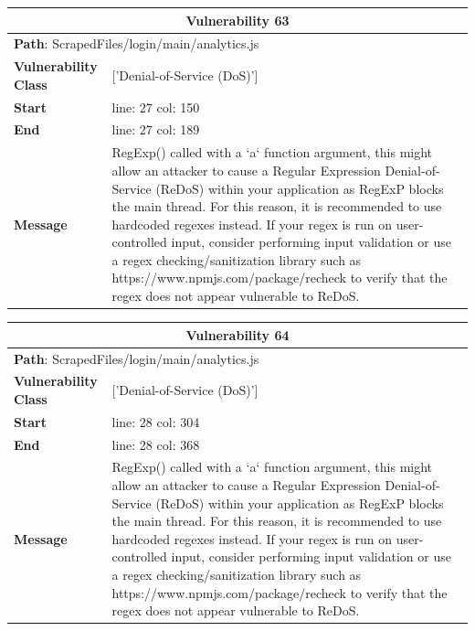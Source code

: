 \documentclass[12pt]{article}
\begin{document}
\FloatBarrier
\begin{table}[!h]
\centering
\renewcommand{\arraystretch}{1.3}
\begin{tabular}{|l|p{10cm}|}
\hline
\multicolumn{2}{|c|}{\textbf{Vulnerability 63}} \\
\hline
\multicolumn{2}{|l|}{\textbf{Path}: ScrapedFiles/login/main/analytics.js} \\
\hline
\textbf{Vulnerability Class} & ['Denial-of-Service (DoS)'] \\
\hline
\textbf{Start} & line: 27 \quad col: 150 \\
\hline
\textbf{End} & line: 27 \quad col: 189 \\
\hline
\textbf{Message} & RegExp() called with a `a` function argument, this might allow an attacker to cause a Regular Expression Denial-of-Service (ReDoS) within your application as RegExP blocks the main thread. For this reason, it is recommended to use hardcoded regexes instead. If your regex is run on user-controlled input, consider performing input validation or use a regex checking/sanitization library such as https://www.npmjs.com/package/recheck to verify that the regex does not appear vulnerable to ReDoS. \\
\hline
\end{tabular}
\end{table}
\vspace{0.7cm}
\FloatBarrier
\begin{table}[!h]
\centering
\renewcommand{\arraystretch}{1.3}
\begin{tabular}{|l|p{10cm}|}
\hline
\multicolumn{2}{|c|}{\textbf{Vulnerability 64}} \\
\hline
\multicolumn{2}{|l|}{\textbf{Path}: ScrapedFiles/login/main/analytics.js} \\
\hline
\textbf{Vulnerability Class} & ['Denial-of-Service (DoS)'] \\
\hline
\textbf{Start} & line: 28 \quad col: 304 \\
\hline
\textbf{End} & line: 28 \quad col: 368 \\
\hline
\textbf{Message} & RegExp() called with a `a` function argument, this might allow an attacker to cause a Regular Expression Denial-of-Service (ReDoS) within your application as RegExP blocks the main thread. For this reason, it is recommended to use hardcoded regexes instead. If your regex is run on user-controlled input, consider performing input validation or use a regex checking/sanitization library such as https://www.npmjs.com/package/recheck to verify that the regex does not appear vulnerable to ReDoS. \\
\hline
\end{tabular}
\end{table}
\end{document}
